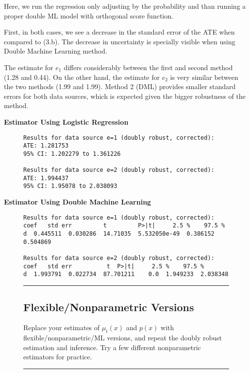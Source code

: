 \documentclass{article}
\newenvironment{colorparagraph}[1]{\par\color{#1}}{\par}
\begin{document}
Here, we run the regression only adjusting by the probability and than running a proper double ML model with orthogonal score function.

First, in both cases, we see a decrease in the standard error of the ATE when compared to (3.b). The decrease in uncertainty is specially visible when using Double Machine Learning method.

The estimate for $e_1$ differs considerably between the first and second method (1.28 and 0.44). On the other hand, the estimate for $e_2$ is very similar between the two methods (1.99 and 1.99). Method 2 (DML) provides smaller standard errors for both data sources, which is expected given the bigger robustness of the method.

\textbf{Estimator Using Logistic Regression}

\begin{figure}[H]
  \begin{lstlisting}[style=RstyleComment, caption=Doubly Robust ATE Estimation]
Results for data source e=1 (doubly robust, corrected):
ATE: 1.281753 
95% CI: 1.202279 to 1.361226 

Results for data source e=2 (doubly robust, corrected):
ATE: 1.994437 
95% CI: 1.95078 to 2.038093 
  \end{lstlisting}
\end{figure}

\textbf{Estimator Using Double Machine Learning}

\begin{figure}[H]
\begin{lstlisting}[style=RstyleComment, caption=Doubly Robust ATE Estimation]
Results for data source e=1 (doubly robust, corrected):
coef   std err         t         P>|t|     2.5 %    97.5 %
d  0.445511  0.030286  14.71035  5.532050e-49  0.386152  0.504869

Results for data source e=2 (doubly robust, corrected):
coef   std err          t  P>|t|     2.5 %    97.5 %
d  1.993791  0.022734  87.701211    0.0  1.949233  2.038348
\end{lstlisting}
\end{figure}

\begin{figure}[H]
  \begin{colorparagraph}{questioncolor}
  \rule{\textwidth}{0.5pt}
  \label{q3d}
  \subsection{Flexible/Nonparametric Versions}

  Replace your estimates of \( \mu_t(x) \) and \( p(x) \) with flexible/nonparametric/ML versions, and repeat the doubly robust estimation and inference. Try a few different nonparametric estimators for practice.

  \rule{\textwidth}{0.5pt}
  \end{colorparagraph}
\end{figure}
\end{document}
